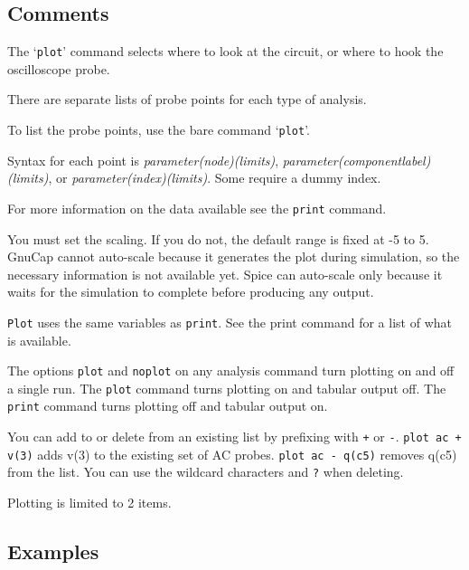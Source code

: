 \subsection{Comments}

The `{\tt plot}' command selects where to look at the circuit, or where to
hook the oscilloscope probe.

There are separate lists of probe points for each type of analysis.

To list the probe points, use the bare command `{\tt plot}'.

Syntax for each point is {\it parameter(node)(limits)}, {\it
parameter(componentlabel)(limits)}, or {\it parameter(index)(limits)}.
Some require a dummy index.

For more information on the data available see the {\tt print} command.

You must set the scaling.  If you do not, the default range is fixed
at -5 to 5.  GnuCap cannot auto-scale because it generates the plot
during simulation, so the necessary information is not available yet.
Spice can auto-scale only because it waits for the simulation to
complete before producing any output.

{\tt Plot} uses the same variables as {\tt print}.  See the print command 
for a list of what is available.

The options {\tt plot} and {\tt noplot} on any analysis command turn
plotting on and off a single run.  The {\tt plot} command turns 
plotting on and tabular output off.  The {\tt print} command turns plotting 
off and tabular output on.

You can add to or delete from an existing list by prefixing with
{\tt +} or {\tt -}.  {\tt plot ac + v(3)} adds v(3) to the existing
set of AC probes.  {\tt plot ac - q(c5)} removes q(c5) from the
list.  You can use the wildcard characters {\tt *} and {\tt ?} when
deleting.

Plotting is limited to 2 items.
\subsection{Examples}

